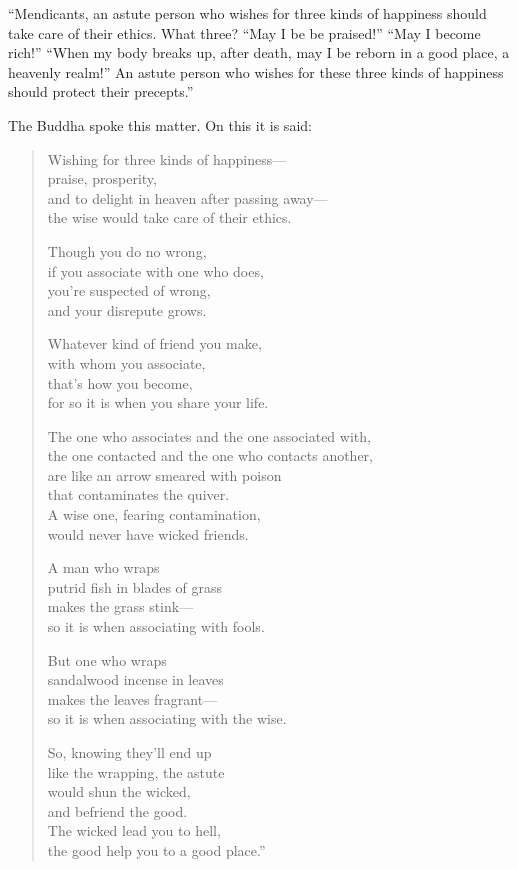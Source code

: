 \documentclass[12pt,openany]{book}%
\begin{document}
“Mendicants, an astute person who wishes for three kinds of happiness should take care of their ethics. What three? “May I be be praised!” “May I become rich!” “When my body breaks up, after death, may I be reborn in a good place, a heavenly realm!” An astute person who wishes for these three kinds of happiness should protect their precepts.” 

The Buddha spoke this matter. On this it is said: 

\begin{verse}%
Wishing for three kinds of happiness—\\
praise, prosperity, \\
and to delight in heaven after passing away—\\
the wise would take care of their ethics. 

Though you do no wrong, \\
if you associate with one who does, \\
you’re suspected of wrong, \\
and your disrepute grows. 

Whatever kind of friend you make, \\
with whom you associate, \\
that’s how you become, \\
for so it is when you share your life. 

The one who associates and the one associated with, \\
the one contacted and the one who contacts another, \\
are like an arrow smeared with poison \\
that contaminates the quiver. \\
A wise one, fearing contamination, \\
would never have wicked friends. 

A man who wraps \\
putrid fish in blades of grass \\
makes the grass stink—\\
so it is when associating with fools. 

But one who wraps \\
sandalwood incense in leaves \\
makes the leaves fragrant—\\
so it is when associating with the wise. 

So, knowing they’ll end up \\
like the wrapping, the astute \\
would shun the wicked, \\
and befriend the good. \\
The wicked lead you to hell, \\
the good help you to a good place.” 

%
\end{verse}
\end{document}
